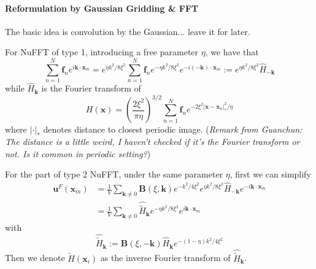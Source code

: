 \documentclass{article}[12pt]
\begin{document}
\paragraph{Reformulation by Gaussian Gridding \& FFT} 
The basic idea is convolution by the Gaussian... leave it for later.

For NuFFT of type 1, introducing a free parameter $\eta$, we have that
\begin{equation}
\sum_{n=1}^{N} \mathbf{f}_n e ^{i \mathbf{k} \cdot \mathbf{x}_m }  = e^{\eta k^2 / 8 \xi^2} \sum_{n=1}^{N} \mathbf{f}_n e^{-\eta k^2 / 8 \xi^2} e ^{-i (\mathbf{-k}) \cdot \mathbf{x}_m }  := e^{\eta k^2 / 8 \xi^2} \hat{H}_{\mathbf{-k}}
\end{equation}
while $\hat{H}_{\mathbf{k}}$ is the Fourier transform of 
\begin{equation}
H(\mathbf{x}) = \left(\frac{2 \xi^2}{\pi \eta}\right)^{3/2}  \sum_{n=1}^N \mathbf{f}_n e^{-2 \xi^2 |\mathbf{x} - \mathbf{x}_n|_{\ast}^2 / \eta} \label{eq:gaussian_gridding_1}
\end{equation}
where $|\cdot|_{\ast}$ denotes distance to closest periodic image. (\textit{Remark from Guanchun: The distance is a little weird, I haven't checked if it's the Fourier transform or not. Is it common in periodic setting?})

For the part of type 2 NuFFT, under the same parameter $\eta$, first we can simplify 
\begin{align}
\mathbf{u}^F (\mathbf{x}_m) & = \frac{1}{V} \sum_{\mathbf{k} \neq 0} \mathbf{B}(\xi, \mathbf{k}) e^{-k^2/4\xi^2} e^{\eta k^2 / 8 \xi^2} \hat{H}_{\mathbf{-k}} e ^{-i \mathbf{k} \cdot \mathbf{x}_m} \\
& = \frac{1}{V} \sum_{\mathbf{k} \neq 0} \hat{\tilde{H}}_{\mathbf{k}} e^{- \eta k^2 / 8 \xi^2}  e ^{i \mathbf{k} \cdot \mathbf{x}_m} 
\end{align}
with 
\begin{equation}
\hat{\tilde{H}}_{\mathbf{k}} := \mathbf{B}(\xi, \mathbf{-k}) \hat{H}_{\mathbf{k}} e^{-(1-\eta)k^2 / 4\xi^2} \label{eq:hat_tilde_h_formula}
\end{equation}
Then we denote $\tilde{H}(\mathbf{x}_i)$ as the inverse Fourier transform of $
\hat{\tilde{H}}_{\mathbf{k}}$.
\end{document}
